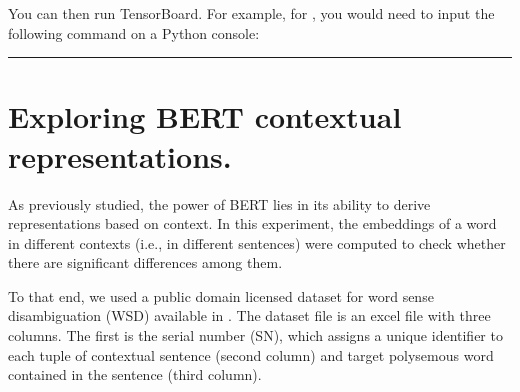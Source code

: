 \documentclass[letterpaper,10pt,english]{sphinxmanual}
\begin{document}
{
\begin{sphinxVerbatim}[commandchars=\\\{\}]
\llap{\color{nbsphinxin}[5]:\,\hspace{\fboxrule}\hspace{\fboxsep}}
  
\end{sphinxVerbatim}
}

You can then run TensorBoard. For example, for , you would need to input the following command on a Python console:



\bigskip\hrule\bigskip



\section{Exploring BERT contextual representations.}
\label{\detokenize{Visualization of BERT embeddings:Exploring-BERT-contextual-representations.}}
As previously studied, the power of BERT lies in its ability to derive representations based on context. In this experiment, the embeddings of a word in different contexts (i.e., in different sentences) were computed to check whether there are significant differences among them.

To that end, we used a public domain licensed dataset for word sense disambiguation (WSD) available in . The dataset file is an excel file with three columns. The first is the serial number (SN), which assigns a unique identifier to each tuple of contextual sentence (second column) and target polysemous word contained in the sentence (third column).
\end{document}
